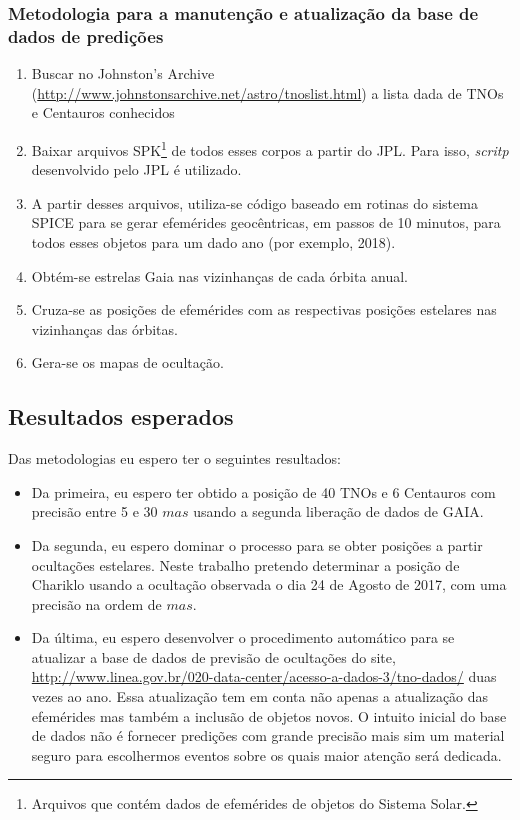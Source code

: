 \documentclass[a4paper, 11pt]{article}
\begin{document}
\subsubsection{Metodologia para a manuten\c c\~ao e atualiza\c c\~ao da base de dados de predi\c c\~oes}
\begin{enumerate}
  \item Buscar no Johnston's Archive (\url{http://www.johnstonsarchive.net/astro/tnoslist.html}) a lista dada de TNOs e Centauros conhecidos
  \item Baixar arquivos SPK\footnote{Arquivos que cont\'em dados de efem\'erides de objetos do Sistema Solar.} de todos esses corpos a partir do JPL. Para isso, \textit{scritp} desenvolvido pelo JPL \'e utilizado.
  \item A partir desses arquivos, utiliza-se c\'odigo baseado em rotinas do sistema SPICE para se gerar efem\'erides geoc\^entricas, em passos de 10 minutos, para todos esses objetos para um dado ano (por exemplo, 2018).
  \item Obt\'em-se estrelas Gaia nas vizinhan\c cas de cada \'orbita anual.
  \item Cruza-se as posi\c c\~oes de efem\'erides com as respectivas posi\c c\~oes estelares nas vizinhan\c cas das \'orbitas.
  \item Gera-se os mapas de oculta\c c\~ao.
\end{enumerate}

\subsection{Resultados esperados}

Das metodologias eu espero ter o seguintes resultados:
\begin{itemize}
  \item Da primeira, eu espero ter obtido a posição de 40 TNOs e 6 Centauros com precisão entre 5 e 30 $mas$ usando a segunda liberação de dados de GAIA.
  \item Da segunda, eu espero dominar o processo para se obter posições a partir ocultações estelares. Neste trabalho pretendo determinar a posição de Chariklo usando a ocultação observada o dia 24 de Agosto de 2017, com uma precisão na ordem de $mas$. 
  \item Da última, eu espero desenvolver o procedimento automático para se atualizar a base de dados de previsão de ocultações do site,  \url{http://www.linea.gov.br/020-data-center/acesso-a-dados-3/tno-dados/} duas
  vezes ao ano. Essa atualização tem em conta não apenas a atualização das efemérides mas também a inclusão de objetos novos. O intuito inicial do base de dados não é fornecer predições com grande precisão mais sim um material seguro para escolhermos eventos sobre os quais maior atenção será dedicada.
\end{itemize}
%
\end{document}
